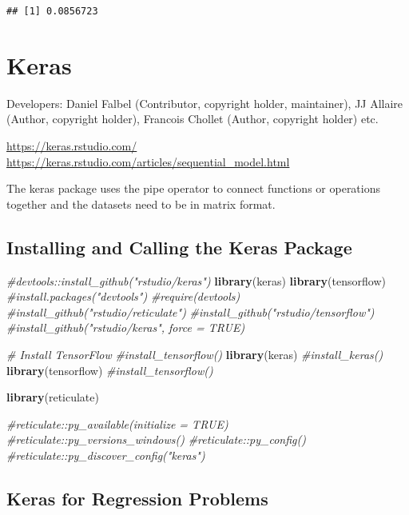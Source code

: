 \documentclass[
]{book}
\newenvironment{Shaded}{\begin{snugshade}}{\end{snugshade}}
\newcommand{\CommentTok}[1]{\textcolor[rgb]{0.56,0.35,0.01}{\textit{#1}}}
\newcommand{\KeywordTok}[1]{\textcolor[rgb]{0.13,0.29,0.53}{\textbf{#1}}}
\newcommand{\NormalTok}[1]{#1}
\begin{document}
\begin{verbatim}
## [1] 0.0856723
\end{verbatim}

\hypertarget{keras}{%
\chapter{Keras}\label{keras}}

Developers: Daniel Falbel (Contributor, copyright holder, maintainer), JJ Allaire (Author, copyright holder), Francois Chollet (Author, copyright holder) etc.

\url{https://keras.rstudio.com/}
\url{https://keras.rstudio.com/articles/sequential_model.html}

The keras package uses the pipe operator to connect functions or operations together and the datasets need to be in matrix format.

\hypertarget{installing-and-calling-the-keras-package}{%
\section{Installing and Calling the Keras Package}\label{installing-and-calling-the-keras-package}}

\begin{Shaded}
\begin{Highlighting}[]
\CommentTok{#devtools::install_github("rstudio/keras")}
\KeywordTok{library}\NormalTok{(keras)}
\KeywordTok{library}\NormalTok{(tensorflow)}
\CommentTok{#install.packages("devtools")}
\CommentTok{#require(devtools)}
\CommentTok{#install_github("rstudio/reticulate")}
\CommentTok{#install_github("rstudio/tensorflow")}
\CommentTok{#install_github("rstudio/keras", force = TRUE)}

\CommentTok{# Install TensorFlow}
\CommentTok{#install_tensorflow()}
\KeywordTok{library}\NormalTok{(keras)}
\CommentTok{#install_keras()}
\KeywordTok{library}\NormalTok{(tensorflow)}
\CommentTok{#install_tensorflow()}

\KeywordTok{library}\NormalTok{(reticulate)}

\CommentTok{#reticulate::py_available(initialize = TRUE)}
\CommentTok{#reticulate::py_versions_windows()}
\CommentTok{#reticulate::py_config()}
\CommentTok{#reticulate::py_discover_config("keras")}
\end{Highlighting}
\end{Shaded}

\hypertarget{keras-for-regression-problems}{%
\section{Keras for Regression Problems}\label{keras-for-regression-problems}}
\end{document}

